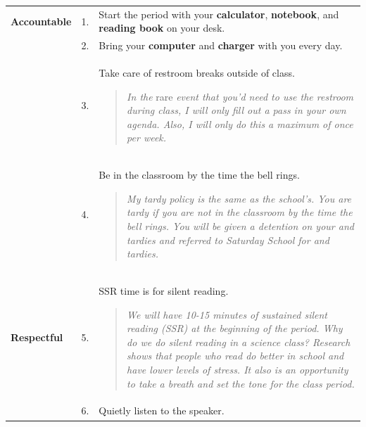 \documentclass[9pt]{exam}
\newcommand{\mg}{\rowcolor{Goldenrod}}
\begin{document}
\begin{center}
  \begin{tabular}
    {
      p{}
      p{}
      p{}
		}
		
    \hline
      \mg \bf Accountable 
      			&  1. & Start the period with your {\bf calculator}, 
                  {\bf notebook}, and {\bf reading book} on your 
                  desk.
      \\
      \mg   &  2. & Bring your {\bf computer} and {\bf charger} with you
                  every day.
      \\
      \mg 	&  3. & Take care of restroom breaks outside of 
                  class.
                  \vspace{-1em}
                  \begin{quotation}
                  	\noindent\small
										\textit{In the} rare \textit{event that you’d need to use the restroom 
										during class, I will only fill out a pass in your own agenda.  Also, I will 
										only do this a maximum of once per week.}
										\vspace{-1.5em}
                  \end{quotation}

      \\
     	\mg   &  4. & Be in the classroom by the time the bell 
                  rings.
                  \vspace{-1em}
                  \begin{quotation}
                  	\noindent\small
										\textit{My tardy policy is the same as the school’s. You are tardy if you 
										are not in the classroom by the time the bell rings.  You will be given 
										a detention on your \nth{3} and \nth{4} tardies and referred to Saturday School 
										for \nth{5} and \nth{6} tardies.}
										\vspace{-1.5em}
                  \end{quotation}
      \\  
    
    \hline
    \bf Respectful
          &  5. & SSR time is for silent reading.
                 	\vspace{-1em}
                  \begin{quotation}
                  	\noindent\small
										\textit{We will have 10-15 minutes of sustained silent reading (SSR) 
										at the beginning of the period.  Why do we do silent reading in a 
										science class?  Research shows that people who read do better in 
										school and have lower levels of stress.  It also is an opportunity to 
										take a breath and set the tone for the class period.}
										\vspace{-1.5em}
                  \end{quotation}
          \\   
          &  6. & Quietly listen to the speaker.         
          \\  


\end{tabular}
\end{center}
\end{document}
